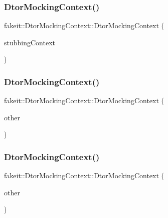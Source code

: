 \subsubsection{\texorpdfstring{DtorMockingContext()}{DtorMockingContext()}\hspace{0.1cm}{\footnotesize\ttfamily [25/27]}}
{\footnotesize\ttfamily fakeit\+::\+Dtor\+Mocking\+Context\+::\+Dtor\+Mocking\+Context (\begin{DoxyParamCaption}\item[{\mbox{\hyperlink{classfakeit_1_1MethodMockingContext}{Method\+Mocking\+Context}}$<$ void $>$\+::Context $\ast$}]{stubbing\+Context }\end{DoxyParamCaption})\hspace{0.3cm}{\ttfamily [inline]}}

\mbox{\label{classfakeit_1_1DtorMockingContext_a03939798c9836d082d94fe4e84d3dcd3}} 
\subsubsection{\texorpdfstring{DtorMockingContext()}{DtorMockingContext()}\hspace{0.1cm}{\footnotesize\ttfamily [26/27]}}
{\footnotesize\ttfamily fakeit\+::\+Dtor\+Mocking\+Context\+::\+Dtor\+Mocking\+Context (\begin{DoxyParamCaption}\item[{\mbox{\hyperlink{classfakeit_1_1DtorMockingContext}{Dtor\+Mocking\+Context}} \&}]{other }\end{DoxyParamCaption})\hspace{0.3cm}{\ttfamily [inline]}}

\mbox{\label{classfakeit_1_1DtorMockingContext_a0cf507524171b8ab2884f269a8a62a60}} 
\subsubsection{\texorpdfstring{DtorMockingContext()}{DtorMockingContext()}\hspace{0.1cm}{\footnotesize\ttfamily [27/27]}}
{\footnotesize\ttfamily fakeit\+::\+Dtor\+Mocking\+Context\+::\+Dtor\+Mocking\+Context (\begin{DoxyParamCaption}\item[{\mbox{\hyperlink{classfakeit_1_1DtorMockingContext}{Dtor\+Mocking\+Context}} \&\&}]{other }\end{DoxyParamCaption})\hspace{0.3cm}{\ttfamily [inline]}}



